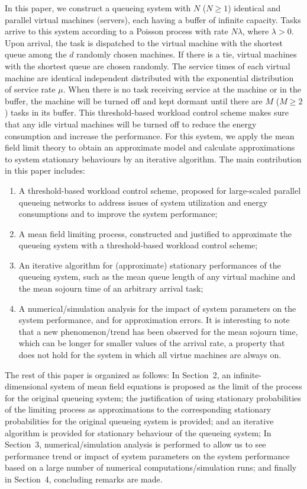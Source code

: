 \documentclass[12pt]{article}
\begin{document}
In this paper, we construct a queueing system with $N$ ($N\geq1$) identical and parallel virtual machines (servers), each having a buffer of infinite capacity. Tasks arrive to this system according to a Poisson process with rate $N\lambda$, where $\lambda>0$. Upon arrival, the task is dispatched to the virtual machine with the shortest queue among the $d$ randomly chosen machines. If there is a tie, virtual machines with the shortest queue are chosen randomly. The service times of each virtual machine are identical independent distributed with the exponential distribution of service rate $\mu$. When there is no task receiving service at the machine or in the buffer, the machine will be turned off and kept dormant until there are $M$ ($M\geq 2$) tasks in its buffer. This threshold-based workload control scheme makes sure that any idle virtual machines will be turned off to reduce the energy consumption and increase the performance. For this system, we apply the mean field limit theory to obtain an approximate model and calculate approximations to system stationary behaviours by an iterative algorithm.
The main contribution in this paper includes:
\begin{enumerate}
  \item A threshold-based workload control scheme, proposed for large-scaled parallel queueing networks to address issues of system utilization and energy consumptions and to improve the system performance;
  \item A mean field limiting process, constructed and justified to approximate the queueing system with a threshold-based workload control scheme;
  \item An iterative algorithm for (approximate) stationary performances of the queueing system, such as the mean queue length of any virtual machine and the mean sojourn time of an arbitrary arrival task;
  \item A numerical/simulation analysis for the impact of system parameters on the system performance, and for approximation errors. It is interesting to note that a new phenomenon/trend has been observed for the mean sojourn time, which can be longer for smaller values of the arrival rate, a property that does not hold for the system in which all virtue machines are always on.
\end{enumerate}

The rest of this paper is organized as follows: In Section~2, an infinite-dimensional system of mean field equations is proposed as the limit of the process for the original queueing system; the justification of using stationary probabilities of the limiting process as approximations to the corresponding stationary probabilities for the original queueing system is provided; and an iterative algorithm is provided for stationary behaviour of the queueing system; In Section~3, numerical/simulation analysis is performed to allow us to see performance trend or impact of system parameters on the system performance based on a large number of numerical computations/simulation runs; and finally in Section~4, concluding remarks are made.
\end{document}
